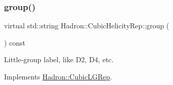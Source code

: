 \mbox{\label{structHadron_1_1CubicHelicityRep_a101a7d76cd8ccdad0f272db44b766113}} 
\subsubsection{\texorpdfstring{group()}{group()}\hspace{0.1cm}{\footnotesize\ttfamily [2/3]}}
{\footnotesize\ttfamily virtual std\+::string Hadron\+::\+Cubic\+Helicity\+Rep\+::group (\begin{DoxyParamCaption}{ }\end{DoxyParamCaption}) const\hspace{0.3cm}{\ttfamily [pure virtual]}}

Little-\/group label, like D2, D4, etc. 

Implements \mbox{\hyperlink{structHadron_1_1CubicLGRep_a9bdb14b519a611d21379ed96a3a9eb41}{Hadron\+::\+Cubic\+L\+G\+Rep}}.



